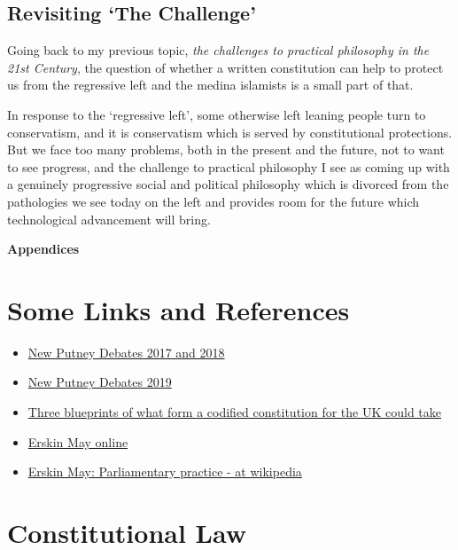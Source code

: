 \documentclass[14pt,titlepage]{extarticle}
\begin{document}
\subsection{Revisiting `The Challenge'}

Going back to my previous topic, {\it the challenges to practical philosophy in the 21st Century}, the question of whether a written constitution can help to protect us from the regressive left and the medina islamists is a small part of that.

In response to the `regressive left', some otherwise left leaning people turn to conservatism, and it is conservatism which is served by constitutional protections.
But we face too many problems, both in the present and the future, not to want to see progress, and the challenge to practical philosophy I see as coming up with a genuinely progressive social and political philosophy which is divorced from the pathologies we see today on the left and provides room for the future which technological advancement will bring.

\pagebreak
{\bf \Large Appendices}
\appendix


\section{Some Links and References}

\begin{itemize}
\item \href{https://www.putneydebates2019.co.uk/New-Putney-Debates}{New Putney Debates 2017 and 2018}
\item \href{https://www.putneydebates2019.co.uk/}{New Putney Debates 2019}
\item \href{https://www.parliament.uk/business/committees/committees-a-z/commons-select/political-and-constitutional-reform-committee/inquiries/parliament-2010/mapping-the-path-to-codifying---or-not-codifying---the-uks-constitution/report-a-new-magna-carta/}{Three blueprints of what form a codified constitution for the UK could take}
  \item \href{https://erskinemay.parliament.uk/}{Erskin May online}
  \item \href{https://en.wikipedia.org/wiki/Erskine_May:_Parliamentary_Practice}{Erskin May: Parliamentary practice - at wikipedia}
\end{itemize}

\section{Constitutional Law}\label{ConstitutionalLaw}
\end{document}

